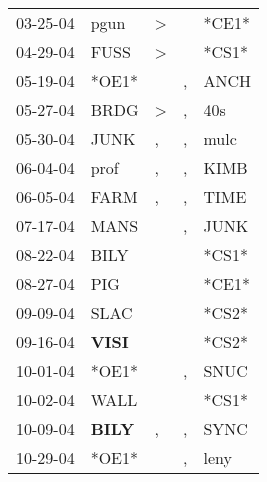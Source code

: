 \begin{supertabular}{p{0.07\textwidth}p{0.06\textwidth}p{0.02\textwidth}p{0.02\textwidth}p{0.06\textwidth}}
 03-25-04\textsuperscript{} &           pgun\textsuperscript{} &  \textgreater &               &                            *CE1* \\
 04-29-04\textsuperscript{} &           FUSS\textsuperscript{} &  \textgreater &               &                            *CS1* \\
 05-19-04\textsuperscript{} &                            *OE1* &               &             , &           ANCH\textsuperscript{} \\
 05-27-04\textsuperscript{} &           BRDG\textsuperscript{} &  \textgreater &             , &            40s\textsuperscript{} \\
 05-30-04\textsuperscript{} &           JUNK\textsuperscript{} &             , &             , &           mulc\textsuperscript{} \\
 06-04-04\textsuperscript{} &           prof\textsuperscript{} &             , &             , &           KIMB\textsuperscript{} \\
 06-05-04\textsuperscript{} &           FARM\textsuperscript{} &             , &             , &           TIME\textsuperscript{} \\
 07-17-04\textsuperscript{} &           MANS\textsuperscript{} &               &             , &           JUNK\textsuperscript{} \\
 08-22-04\textsuperscript{} &           BILY\textsuperscript{} &               &               &                            *CS1* \\
 08-27-04\textsuperscript{} &            PIG\textsuperscript{} &               &               &                            *CE1* \\
 09-09-04\textsuperscript{} &           SLAC\textsuperscript{} &               &               &                            *CS2* \\
 09-16-04\textsuperscript{} &  \textbf{VISI\textsuperscript{}} &               &               &                            *CS2* \\
 10-01-04\textsuperscript{} &                            *OE1* &               &             , &           SNUC\textsuperscript{} \\
 10-02-04\textsuperscript{} &           WALL\textsuperscript{} &               &               &                            *CS1* \\
 10-09-04\textsuperscript{} &  \textbf{BILY\textsuperscript{}} &             , &             , &           SYNC\textsuperscript{} \\
 10-29-04\textsuperscript{} &                            *OE1* &               &             , &           leny\textsuperscript{} \\

\end{supertabular}

